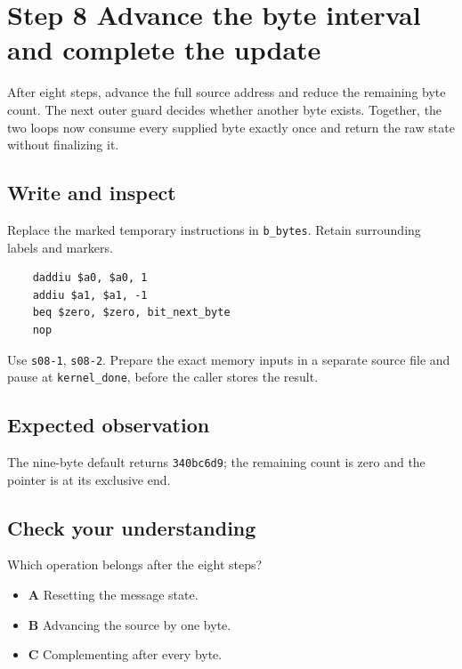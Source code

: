 \section{Step 8 Advance the byte interval and complete the update}\label{crc-s08}

After eight steps, advance the full source address and reduce the remaining byte count. The next outer guard decides whether another byte exists. Together, the two loops now consume every supplied byte exactly once and return the raw state without finalizing it.

\subsection{Write and inspect}
Replace the marked temporary instructions in \texttt{b\_bytes}. Retain surrounding labels and markers.

\begin{verbatim}
    daddiu $a0, $a0, 1
    addiu $a1, $a1, -1
    beq $zero, $zero, bit_next_byte
    nop
\end{verbatim}

Use \texttt{s08-1}, \texttt{s08-2}. Prepare the exact memory inputs in a separate source file and pause at \texttt{kernel\_done}, before the caller stores the result.

\subsection{Expected observation}
The nine-byte default returns \texttt{340bc6d9}; the remaining count is zero and the pointer is at its exclusive end.

\subsection{Check your understanding}
Which operation belongs after the eight steps?

\begin{itemize}
\item \textbf{A} Resetting the message state.
\item \textbf{B} Advancing the source by one byte.
\item \textbf{C} Complementing after every byte.
\end{itemize}
